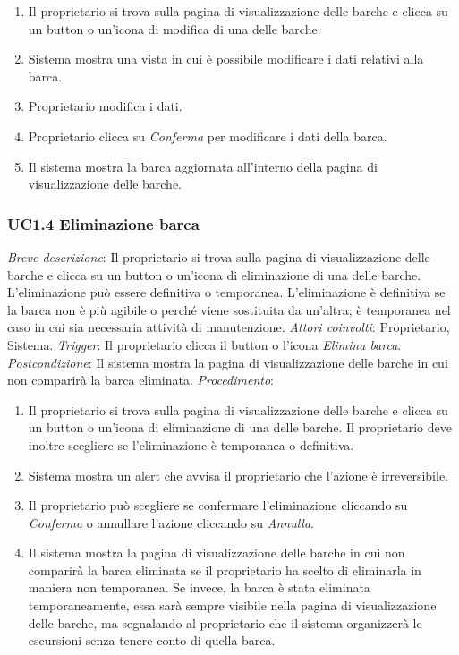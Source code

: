 \begin{enumerate}
    \item Il proprietario si trova sulla pagina di visualizzazione delle barche e clicca su un button o un'icona di modifica di una delle barche.
    \item Sistema mostra una vista in cui è possibile modificare i dati relativi alla barca.
    \item Proprietario modifica i dati.
    \item Proprietario clicca su \textit{Conferma} per modificare i dati della barca.
    \item Il sistema mostra la barca aggiornata all'interno della pagina di visualizzazione delle barche.
\end{enumerate}

\subsubsection{UC1.4 Eliminazione barca}

\noindent \emph{Breve descrizione}: Il proprietario si trova sulla pagina di visualizzazione delle barche e clicca su un button o un'icona di eliminazione di una delle barche.
L'eliminazione può essere definitiva o temporanea. L'eliminazione è definitiva se la barca non è più agibile o perché viene sostituita da un'altra;
è temporanea nel caso in cui sia necessaria attività di manutenzione.\medbreak
\noindent \emph{Attori coinvolti}: Proprietario, Sistema.\medbreak
\noindent \emph{Trigger}: Il proprietario clicca il button o l'icona \textit{Elimina barca}.\medbreak
\noindent \emph{Postcondizione}: Il sistema mostra la pagina di visualizzazione delle barche in cui non comparirà la barca eliminata.\medbreak
\noindent \emph{Procedimento}:

\begin{enumerate}
    \item Il proprietario si trova sulla pagina di visualizzazione delle barche e clicca su un button o un'icona di eliminazione di una delle barche. Il proprietario deve inoltre
          scegliere se l'eliminazione è temporanea o definitiva.
    \item Sistema mostra un alert che avvisa il proprietario che l'azione è irreversibile.
    \item Il proprietario può scegliere se confermare l'eliminazione cliccando su \textit{Conferma} o annullare l'azione cliccando su \textit{Annulla}.
    \item Il sistema mostra la pagina di visualizzazione delle barche in cui non comparirà la barca eliminata se il proprietario ha scelto di eliminarla in maniera non temporanea.
          Se invece, la barca è stata eliminata temporaneamente, essa sarà sempre visibile nella pagina di visualizzazione delle barche, ma segnalando al proprietario che il sistema organizzerà
          le escursioni senza tenere conto di quella barca.
\end{enumerate}

